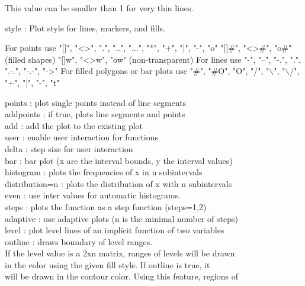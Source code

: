 \documentclass{article}
\newenvironment{eulernotebook}{\par}{\par}
\newenvironment{eulercomment}{\par\medskip}{\par\medskip}
\begin{document}
\begin{eulernotebook}
\begin{eulercomment}
\begin{eulercomment}
\begin{eulercomment}
\begin{eulercomment}
\begin{eulerttcomment}
            This value can be smaller than 1 for very thin lines.
\end{eulerttcomment}
\begin{eulercomment}
style     : Plot style for lines, markers, and fills.\\
\end{eulercomment}
\begin{eulerttcomment}
            For points use
            "[]", "<>", ".", "..", "...",
            "*", "+", "|", "-", "o"
            "[]#", "<>#", "o#" (filled shapes)
            "[]w", "<>w", "ow" (non-transparent)
            For lines use
            "-", "--", "-.", ".", ".-.", "-.-", "->"
            For filled polygons or bar plots use
            "#", "#O", "O", "/", "\(\backslash\)", "\(\backslash\)/",
            "+", "|", "-", "t"
\end{eulerttcomment}
\begin{eulercomment}
points    : plot single points instead of line segments\\
addpoints : if true, plots line segments and points\\
add       : add the plot to the existing plot\\
user      : enable user interaction for functions\\
delta     : step size for user interaction\\
bar       : bar plot (x are the interval bounds, y the interval values)\\
histogram : plots the frequencies of x in n subintervals\\
distribution=n : plots the distribution of x with n subintervals\\
even      : use inter values for automatic histograms.\\
steps     : plots the function as a step function (steps=1,2)\\
adaptive  : use adaptive plots (n is the minimal number of steps)\\
level     : plot level lines of an implicit function of two variables\\
outline   : draws boundary of level ranges.
\\
If the level value is a 2xn matrix, ranges of levels will be drawn\\
in the color using the given fill style. If outline is true, it\\
will be drawn in the contour color. Using this feature, regions of\\

\end{eulercomment}
\end{eulercomment}
\end{eulercomment}
\end{eulercomment}
\end{eulercomment}
\end{eulernotebook}
\end{document}
